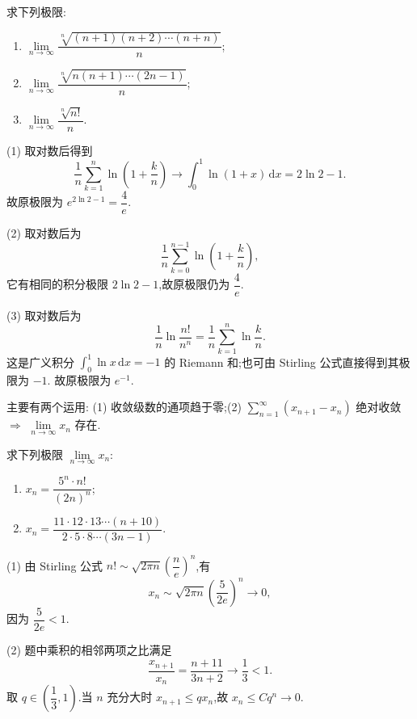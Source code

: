 \begin{example}
  求下列极限:
  \begin{enumerate}
    \item $\displaystyle
            \lim\limits_{n\to\infty}
            \dfrac{\sqrt[n]{(n+1)(n+2)\cdots(n+n)}}{n}$;
    \item $\displaystyle
            \lim\limits_{n\to\infty}
            \dfrac{\sqrt[n]{n(n+1)\cdots(2n-1)}}{n}$;
    \item $\displaystyle
            \lim\limits_{n\to\infty}\dfrac{\sqrt[n]{n!}}{n}$.
  \end{enumerate}
\end{example}
\exampleblank

\begin{solution}

  (1) 取对数后得到
  \[
    \dfrac{1}{n}\sum\limits_{k=1}^n\ln\left(1+\dfrac{k}{n}\right)
    \longrightarrow\int_0^1\ln(1+x)\,\mathrm{d}x=2\ln2-1.
  \]
  故原极限为 $e^{2\ln2-1}=\dfrac{4}{e}$.

  (2) 取对数后为
  \[
    \dfrac{1}{n}\sum\limits_{k=0}^{n-1}\ln\left(1+\dfrac{k}{n}\right),
  \]
  它有相同的积分极限 $2\ln2-1$,故原极限仍为 $\dfrac{4}{e}$.

  (3) 取对数后为
  \[
    \dfrac{1}{n}\ln\dfrac{n!}{n^n}
    =\dfrac{1}{n}\sum\limits_{k=1}^n\ln\dfrac{k}{n}.
  \]
  这是广义积分 $\displaystyle \int_0^1\ln x\,\mathrm{d}x=-1$ 的 Riemann 和;也可由 Stirling 公式直接得到其极限为 $-1$.
  故原极限为 $e^{-1}$.
\end{solution}




主要有两个运用: (1) 收敛级数的通项趋于零;(2) 
$\displaystyle\sum\limits_{n=1}^{\infty}(x_{n+1}-x_{n})$
绝对收敛 $\Rightarrow$
$\displaystyle \lim\limits_{n\to\infty}x_n$
存在.

\begin{example}
  求下列极限 $\displaystyle \lim\limits_{n\to\infty}x_n$:
  \begin{enumerate}
    \item $\displaystyle x_n=\dfrac{5^n\cdot n!}{(2n)^n}$;
    \item $\displaystyle x_n=\dfrac{11\cdot12\cdot13\cdots(n+10)}{2\cdot5\cdot8\cdots(3n-1)}$.
  \end{enumerate}
\end{example}
\exampleblank

\begin{solution}

  (1) 由 Stirling 公式 $n!\sim\sqrt{2\pi n}\left(\dfrac{n}{e}\right)^n$,有
  \[
    x_n\sim\sqrt{2\pi n}\left(\dfrac{5}{2e}\right)^n\longrightarrow0,
  \]
  因为 $\dfrac{5}{2e}<1$.

  (2) 题中乘积的相邻两项之比满足
  \[
    \dfrac{x_{n+1}}{x_n}=\dfrac{n+11}{3n+2}\longrightarrow\dfrac{1}{3}<1.
  \]
  取 $q\in\left(\dfrac{1}{3},1\right)$.当 $n$ 充分大时 $x_{n+1}\leq qx_n$,故
  $x_n\leq Cq^n\to0$.
\end{solution}

